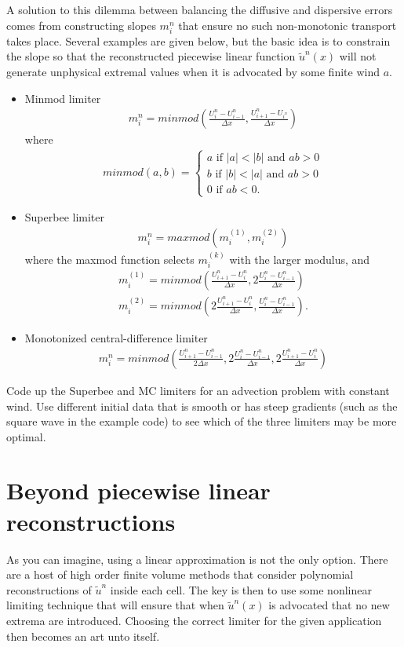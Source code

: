 A solution to this dilemma between balancing the diffusive and dispersive errors comes from constructing slopes $m_i^n$ that ensure no such non-monotonic transport takes place.  Several examples are given below, but the basic idea is to constrain the slope so that the reconstructed piecewise linear function $\tilde{u}^n(x)$ will not generate unphysical extremal values when it is advocated by some finite wind $a$.

\begin{itemize}
\item Minmod limiter
\begin{gather}
m_i^n = minmod\left(\frac{U_i^n-U_{i-1}^n}{\Delta x},\frac{U_{i+1}^n-U_{i^n}}{\Delta x}\right)
\end{gather}
where
\begin{gather}
minmod(a,b) = \left\{\begin{array}{ccc}a  \mbox{ if } |a| < |b|  \mbox{ and } ab>0\\
b  \mbox{ if } |b|<|a|  \mbox{ and } ab>0\\ 0  \mbox{ if } ab < 0 .\end{array}\right.
\end{gather}
\item Superbee limiter
\begin{gather}
m_i^n = maxmod(m^{(1)}_i,m^{(2)}_i)
\end{gather}
where the maxmod function selects $m^{(k)}_i$ with the larger modulus, and
\begin{gather}
m^{(1)}_i = minmod \left(\frac{U_{i+1}^n-U_i^n}{\Delta x},2\frac{U_i^n-U_{i-1}^n}{\Delta x}\right)\\
m^{(2)}_i = minmod \left( 2\frac{U_{i+1}^n-U_i^n}{\Delta x},\frac{U_i^n-U_{i-1}^n}{\Delta x}\right).
\end{gather}
\item Monotonized central-difference limiter
\begin{gather}
m_i^n = minmod\left(\frac{U_{i+1}^n-U_{i-1}^n}{2\Delta x},2\frac{U_i^n-U_{i-1}^n}{\Delta x},2\frac{U_{i+1}^n-U_i^n}{\Delta x}\right)
\end{gather}
\end{itemize}

\begin{problem}
Code up the Superbee and MC limiters for an advection problem with constant wind.  Use different initial data that is smooth or has steep gradients (such as the square wave in the example code) to see which of the three limiters may be more optimal.
\end{problem}

\section{Beyond piecewise linear reconstructions}
As you can imagine, using a linear approximation is not the only option.  There are a host of high order finite volume methods that consider polynomial reconstructions of $\tilde{u}^n$ inside each cell.  The key is then to use some nonlinear limiting technique that will ensure that when $\tilde{u}^n(x)$ is advocated that no new extrema are introduced.  Choosing the correct limiter for the given application then becomes an art unto itself.